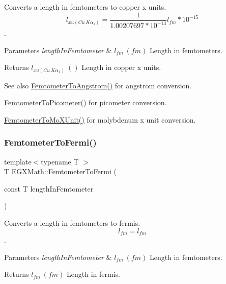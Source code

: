 Converts a length in femtometers to copper x units. \[ l_{xu(Cu\ K\alpha_1)}= \frac{1}{1.00207697*10^{-13}} l_{fm} * 10^{-15}\]. 


\begin{DoxyParams}{Parameters}
{\em length\+In\+Femtometer} & $ l_{fm}\ (fm)$ Length in femtometers. \\
\hline
\end{DoxyParams}
\begin{DoxyReturn}{Returns}
$ l_{xu(Cu\ K\alpha_1)}\ ()$ Length in copper x units. 
\end{DoxyReturn}
\begin{DoxySeeAlso}{See also}
\mbox{\hyperlink{group___e_g_x_math-_conversions-_length_conversions-_s_i-_femtometer-_non-_s_i_ga72862654ebe3812db0fbf8d11d7059ff}{Femtometer\+To\+Angstrom()}} for angstrom conversion. 

\mbox{\hyperlink{group___e_g_x_math-_conversions-_length_conversions-_s_i-_femtometer-_s_i_gadfcd6b374d4134cad0ac1ce7a8e50509}{Femtometer\+To\+Picometer()}} for picometer conversion. 

\mbox{\hyperlink{group___e_g_x_math-_conversions-_length_conversions-_s_i-_femtometer-_non-_s_i_ga57801d7c681362c1a11053233e31c415}{Femtometer\+To\+Mo\+X\+Unit()}} for molybdenum x unit conversion. 
\end{DoxySeeAlso}
\mbox{\label{group___e_g_x_math-_conversions-_length_conversions-_s_i-_femtometer-_non-_s_i_gaa2e838ef76ce47a3375291d76990b865}} 
\subsubsection{\texorpdfstring{Femtometer\+To\+Fermi()}{FemtometerToFermi()}}
{\footnotesize\ttfamily template$<$typename T $>$ \\
T E\+G\+X\+Math\+::\+Femtometer\+To\+Fermi (\begin{DoxyParamCaption}\item[{const T}]{length\+In\+Femtometer }\end{DoxyParamCaption})}



Converts a length in femtometers to fermis. \[ l_{fm}=l_{fm} \]. 


\begin{DoxyParams}{Parameters}
{\em length\+In\+Femtometer} & $ l_{fm}\ (fm)$ Length in femtometers. \\
\hline
\end{DoxyParams}
\begin{DoxyReturn}{Returns}
$ l_{fm}\ (fm)$ Length in fermis. 
\end{DoxyReturn}
\mbox{\label{group___e_g_x_math-_conversions-_length_conversions-_s_i-_femtometer-_non-_s_i_gac1a358bdb9bf33dec3cb847cafe1bc71}} 
